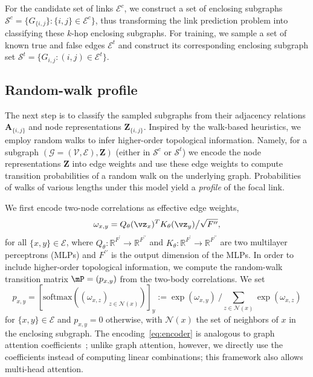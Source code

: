 \documentclass[11pt]{article}
\newcommand{\UPDATE}[1]{\textcolor{WowColor}{{#1}}}
\newcounter{margincounter}
\newcommand{\displaycounter}{{\arabic{margincounter}}}
\newcommand{\incdisplaycounter}{{\stepcounter{margincounter}\arabic{margincounter}}}
\newcommand{\fTBD}[1]{\textcolor{SubtleColor}{$\,^{(\incdisplaycounter)}$}\marginnote{\tiny\textcolor{SubtleColor}{ {\tiny $(\displaycounter)$} #1}}}
\renewcommand{\fTBD}[1]{}
\renewcommand{\UPDATE}[1]{#1}
\begin{document}
For the candidate set of links $\mathcal{E}^c$, we construct a set of enclosing subgraphs $\mathcal{S}^c = \{G_{\{i,j}\}: \{i,j\} \in \mathcal{E}^c\}$, thus transforming the link prediction problem into classifying these $k$-hop enclosing subgraphs. For training, we sample a set of known true and false edges $\mathcal{E}^t$ and construct its corresponding enclosing subgraph set $\mathcal{S}^t = \{G_{i,j}:(i,j)\in \mathcal{E}^t\}$.
\vspace{-2mm}
\subsection{Random-walk profile}
\label{sub:rwp}
\vspace{-2mm}

The next step is to classify the sampled subgraphs from their adjacency relations $\mathbf{A}_{\{i,j\}}$ and node representations $\mathbf{Z}_{\{i,j\}}$.  Inspired by the walk-based heuristics, we employ random walks to infer higher-order topological information. Namely, for a subgraph $(\mathcal{G} = (\mathcal{V}, \mathcal{E}), \mathbf{Z})$\fTBD{Check that $\mathcal{E}$ is not used for the total link set.} (either in $\mathcal{S}^c$ or $\mathcal{S}^t$) we encode the node representations $\mathbf{Z}$ into edge weights and use these edge weights to compute transition probabilities of a random walk on the underlying graph. Probabilities of walks of various lengths under this model yield a \emph{profile} of the focal link.\fTBD{How about the name ``walkprints''?}

We first encode two-node correlations \UPDATE{as effective edge weights},
\begin{equation}\label{eq:omega}
\omega_{x,y} = { Q_\theta(\vz_x)^T K_\theta(\vz_y)} \big/ {\sqrt{F^{\prime \prime}}},
\end{equation}
for all $\{x,y\}\in \mathcal{E}$, where $Q_\theta: \mathbb{R}^{F^{\prime}}\to \mathbb{R}^{F^{\prime \prime}}$ and $K_\theta: \mathbb{R}^{F^{\prime}}\to \mathbb{R}^{F^{\prime \prime}}$ are two multilayer perceptrons (MLPs) and $F^{\prime \prime}$ is the output dimension of the MLPs. In order to include higher-order topological information, we compute the random-walk transition matrix $\mP = (p_{x,y})$ from the two-body correlations. We set
\begin{equation}\label{eq:encoder}
p_{x, y} = 
\left[\mathrm{softmax}\left( (\omega_{x,z})_{z \in \mathcal{N}(x)} \right)\right]_y := \exp (\omega_{x,y}) \ / \textstyle \sum_{z\in \mathcal{N}(x)}\exp (\omega_{x,z}) 
\end{equation}
for $\{x, y\} \in \mathcal{E}$ and $p_{x, y} = 0$ otherwise,
with $\mathcal{N}(x)$ the set of neighbors of $x$ in the enclosing subgraph. The encoding~\eqref{eq:encoder} is analogous to graph attention coefficients~\citep{velivckovic2017graph,shi2020masked}; unlike graph attention, however, we directly use the coefficients instead of computing linear combinations;  this framework also allows multi-head attention.
\end{document}
